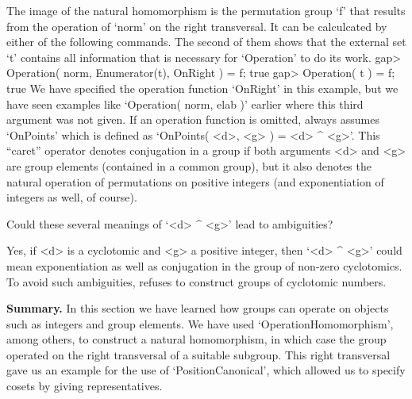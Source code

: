 The image of  the natural homomorphism  is the permutation group `f' that
results from the operation of `norm' on the right  transversal. It can be
calculcated by either of the following commands. The second of them shows
that the external set `t' contains all information  that is necessary for
`Operation' to do its work.
\beginexample
    gap> Operation( norm, Enumerator(t), OnRight ) = f;
    true
    gap> Operation( t ) = f;
    true
\endexample
We  have specified the operation function  `OnRight' in this example, but
we have seen  examples like `Operation( norm,  elab )' earlier where this
third argument was not given. If an operation function is omitted, {\GAP}
always assumes `OnPoints' which is defined as `OnPoints( <d>, <g> ) = <d>
^ <g>'. This ``caret''  operator denotes conjugation in  a group if  both
arguments <d> and  <g> are group elements  (contained in a common group),
but it also  denotes the natural  operation  of permutations on  positive
integers (and exponentiation of integers as well, of course).

\exercise Could   these  several meanings    of  `<d>  ^ <g>'   lead   to
ambiguities?

\answer Yes, if <d> is a cyclotomic and <g> a positive integer, then `<d>
^ <g>' could mean exponentiation  as well as conjugation  in the group of
non-zero cyclotomics.  To   avoid such  ambiguities, {\GAP}   refuses  to
construct groups of cyclotomic numbers.

%  

{\bf Summary.} In this section we have learned  how groups can operate on
{\GAP}   objects such as  integers  and   group  elements.  We  have used
`OperationHomomorphism',    among   others,   to   construct   a  natural
homomorphism,  in which case the  group operated on the right transversal
of a suitable subgroup. This right transversal gave us an example for the
use of `PositionCanonical', which allowed  us to specify cosets by giving
representatives.

